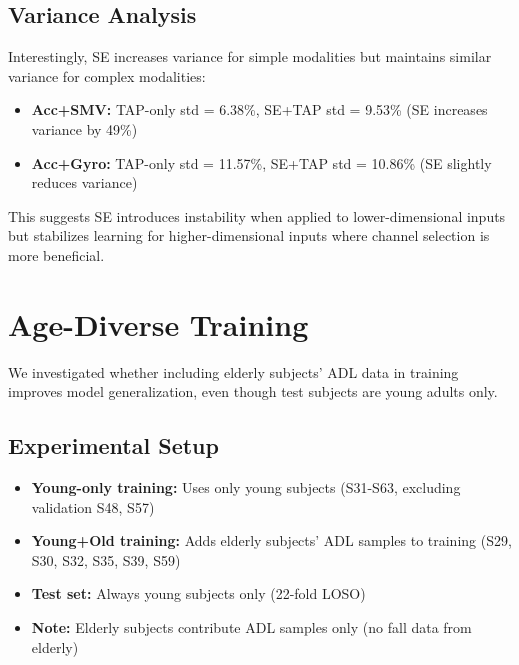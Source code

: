\documentclass{article}
\begin{document}
\subsection{Variance Analysis}

Interestingly, SE increases variance for simple modalities but maintains similar variance for complex modalities:

\begin{itemize}
    \item \textbf{Acc+SMV:} TAP-only std = 6.38\%, SE+TAP std = 9.53\% (SE increases variance by 49\%)
    \item \textbf{Acc+Gyro:} TAP-only std = 11.57\%, SE+TAP std = 10.86\% (SE slightly reduces variance)
\end{itemize}

This suggests SE introduces instability when applied to lower-dimensional inputs but stabilizes learning for higher-dimensional inputs where channel selection is more beneficial.

\section{Age-Diverse Training}

We investigated whether including elderly subjects' ADL data in training improves model generalization, even though test subjects are young adults only.

\subsection{Experimental Setup}

\begin{itemize}
    \item \textbf{Young-only training:} Uses only young subjects (S31-S63, excluding validation S48, S57)
    \item \textbf{Young+Old training:} Adds elderly subjects' ADL samples to training (S29, S30, S32, S35, S39, S59)
    \item \textbf{Test set:} Always young subjects only (22-fold LOSO)
    \item \textbf{Note:} Elderly subjects contribute ADL samples only (no fall data from elderly)
\end{itemize}
\end{document}
